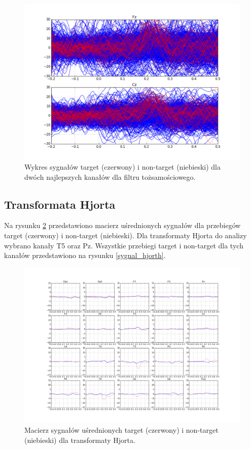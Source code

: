\documentclass[licencjacka,openright]{pracamgr}
\begin{document}
\begin{figure}
\centering
\includegraphics[scale=0.55, trim=10mm 15mm 10mm 15mm, clip=True]{pics/sygnal_toz.png}
\caption{Wykres sygnałów target (czerwony) i non-target (niebieski) dla dwóch najlepszych kanałów dla filtru tożsamościowego.}
\label{sygnal_toz}
\end{figure}

\subsection{Transformata Hjorta}

Na rysunku \ref{macierz_hjorth} przedstawiono macierz uśrednionych sygnałów dla przebiegów target (czerwony) i non-target (niebieski). Dla transformaty Hjorta do analizy wybrano kanały T5 oraz Pz. Wszystkie przebiegi target i non-target dla tych kanałów przedstawiono na rysunku \ref{sygnal_hjorth}.

\begin{figure}
\centering
\includegraphics[scale=0.35, trim=10mm 25mm 10mm 25mm, clip=True]{pics/macierz_hjorth.png}
\caption{Macierz sygnałów uśrednionych target (czerwony) i non-target (niebieski) dla transformaty Hjorta.}
\label{macierz_hjorth}
\end{figure}
\end{document}
